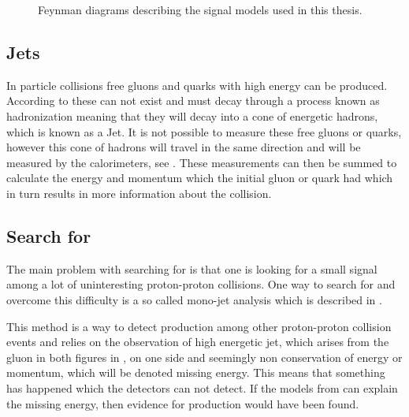  \begin{figure}[H] %
    \hfill
    \caption{Feynman diagrams describing the signal models used in this thesis.}
    \label{fig:opfeyn}
  \end{figure}


\subsection{Jets}\label{sec:tb:subsec:jets}
In particle collisions free gluons and quarks with high energy can be produced. According to \abbrQFT these can not exist and must decay through a process known as hadronization meaning that they will decay into a cone of energetic hadrons, which is known as a Jet. It is not possible to measure these free gluons or quarks, however this cone of hadrons will travel in the same direction and will be measured by the calorimeters, see . These measurements can then be summed to calculate the energy and momentum which the initial gluon or quark had which in turn results in more information about the collision.

\subsection{Search for \abbrWIMPS}\label{sec:tb:subsec:WIMPS}
The main problem with searching for \abbrWIMPS is that one is looking for a small signal among a lot of uninteresting proton-proton collisions. One way to search for \abbrWIMPS and overcome this difficulty is a so called mono-jet analysis which is described in . 

This method is a way to detect \abbrWIMP production among other proton-proton collision events and relies on the observation of high energetic jet, which arises from the gluon in both figures in , on one side and seemingly non conservation of energy or momentum, which will be denoted missing energy. This means that something has happened which the detectors can not detect. If the models from  can explain the missing energy, then evidence for \abbrWIMP production would have been found.

